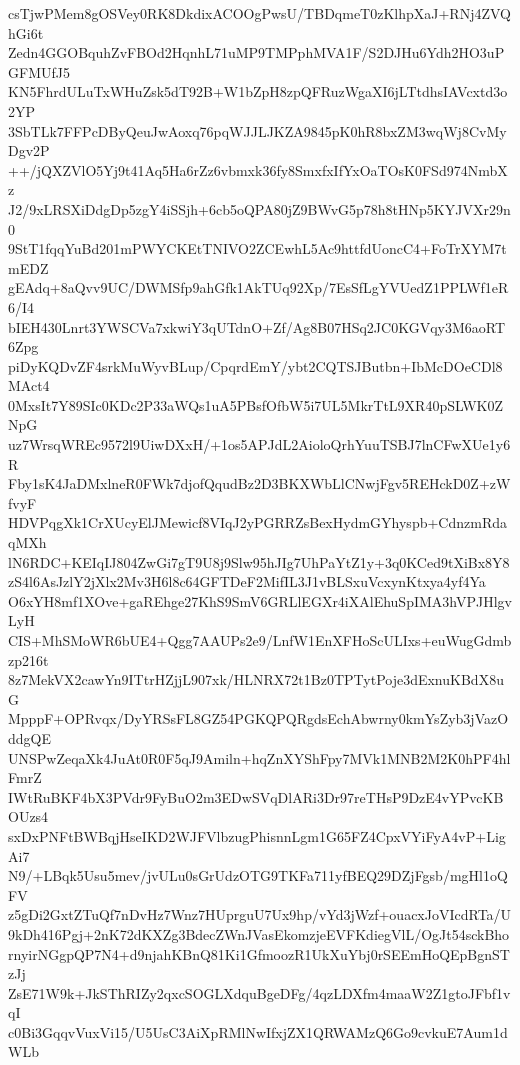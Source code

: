 csTjwPMem8gOSVey0RK8DkdixACOOgPwsU/TBDqmeT0zKlhpXaJ+RNj4ZVQhGi6t
Zedn4GGOBquhZvFBOd2HqnhL71uMP9TMPphMVA1F/S2DJHu6Ydh2HO3uPGFMUfJ5
KN5FhrdULuTxWHuZsk5dT92B+W1bZpH8zpQFRuzWgaXI6jLTtdhsIAVcxtd3o2YP
3SbTLk7FFPcDByQeuJwAoxq76pqWJJLJKZA9845pK0hR8bxZM3wqWj8CvMyDgv2P
++/jQXZVlO5Yj9t41Aq5Ha6rZz6vbmxk36fy8SmxfxIfYxOaTOsK0FSd974NmbXz
J2/9xLRSXiDdgDp5zgY4iSSjh+6cb5oQPA80jZ9BWvG5p78h8tHNp5KYJVXr29n0
9StT1fqqYuBd201mPWYCKEtTNIVO2ZCEwhL5Ac9httfdUoncC4+FoTrXYM7tmEDZ
gEAdq+8aQvv9UC/DWMSfp9ahGfk1AkTUq92Xp/7EsSfLgYVUedZ1PPLWf1eR6/I4
bIEH430Lnrt3YWSCVa7xkwiY3qUTdnO+Zf/Ag8B07HSq2JC0KGVqy3M6aoRT6Zpg
piDyKQDvZF4srkMuWyvBLup/CpqrdEmY/ybt2CQTSJButbn+IbMcDOeCDl8MAct4
0MxsIt7Y89SIc0KDc2P33aWQs1uA5PBsfOfbW5i7UL5MkrTtL9XR40pSLWK0ZNpG
uz7WrsqWREc9572l9UiwDXxH/+1os5APJdL2AioloQrhYuuTSBJ7lnCFwXUe1y6R
Fby1sK4JaDMxlneR0FWk7djofQqudBz2D3BKXWbLlCNwjFgv5REHckD0Z+zWfvyF
HDVPqgXk1CrXUcyElJMewicf8VIqJ2yPGRRZsBexHydmGYhyspb+CdnzmRdaqMXh
lN6RDC+KEIqIJ804ZwGi7gT9U8j9Slw95hJIg7UhPaYtZ1y+3q0KCed9tXiBx8Y8
zS4l6AsJzlY2jXlx2Mv3H6l8c64GFTDeF2MifIL3J1vBLSxuVcxynKtxya4yf4Ya
O6xYH8mf1XOve+gaREhge27KhS9SmV6GRLlEGXr4iXAlEhuSpIMA3hVPJHlgvLyH
CIS+MhSMoWR6bUE4+Qgg7AAUPs2e9/LnfW1EnXFHoScULIxs+euWugGdmbzp216t
8z7MekVX2cawYn9ITtrHZjjL907xk/HLNRX72t1Bz0TPTytPoje3dExnuKBdX8uG
MpppF+OPRvqx/DyYRSsFL8GZ54PGKQPQRgdsEchAbwrny0kmYsZyb3jVazOddgQE
UNSPwZeqaXk4JuAt0R0F5qJ9Amiln+hqZnXYShFpy7MVk1MNB2M2K0hPF4hlFmrZ
IWtRuBKF4bX3PVdr9FyBuO2m3EDwSVqDlARi3Dr97reTHsP9DzE4vYPvcKBOUzs4
sxDxPNFtBWBqjHseIKD2WJFVlbzugPhisnnLgm1G65FZ4CpxVYiFyA4vP+LigAi7
N9/+LBqk5Usu5mev/jvULu0sGrUdzOTG9TKFa711yfBEQ29DZjFgsb/mgHl1oQFV
z5gDi2GxtZTuQf7nDvHz7Wnz7HUprguU7Ux9hp/vYd3jWzf+ouacxJoVIcdRTa/U
9kDh416Pgj+2nK72dKXZg3BdecZWnJVasEkomzjeEVFKdiegVlL/OgJt54sckBho
rnyirNGgpQP7N4+d9njahKBnQ81Ki1GfmoozR1UkXuYbj0rSEEmHoQEpBgnSTzJj
ZsE71W9k+JkSThRIZy2qxcSOGLXdquBgeDFg/4qzLDXfm4maaW2Z1gtoJFbf1vqI
c0Bi3GqqvVuxVi15/U5UsC3AiXpRMlNwIfxjZX1QRWAMzQ6Go9cvkuE7Aum1dWLb
